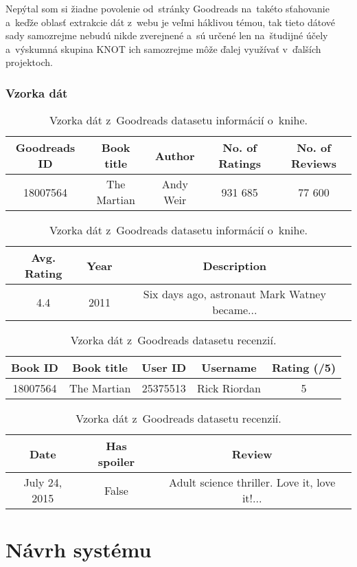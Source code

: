 Nepýtal som si žiadne povolenie od~stránky Goodreads na~takéto sťahovanie a~keďže oblasť extrakcie dát z~webu je veľmi háklivou témou, tak tieto dátové sady samozrejme nebudú nikde zverejnené a~sú určené len na~študijné účely a~výskumná skupina KNOT ich samozrejme môže ďalej využívať v~ďalších projektoch.

\subsection*{Vzorka dát}

\begin{table}[hbt]
\centering
\caption{Vzorka dát z~Goodreads datasetu informácií o~knihe.}
\label{bookinfo}
\begin{tabular}{|c|c|c|c|c|}
\hline
Goodreads ID & Book title & Author & No. of Ratings & No. of Reviews  \\
\hline
18007564 & The Martian & Andy Weir & 931 685 & 77 600\\ 
\hline
\end{tabular}
\begin{tabular}{|c|c|c|}
\hline
Avg. Rating & Year & Description \\
\hline
4.4  & 2011 & Six days ago, astronaut Mark Watney became... \\ 
\hline
\end{tabular}
\end{table}

\begin{table}[hbt]
\centering
\caption{Vzorka dát z~Goodreads datasetu recenzií.}
\label{reviewinfo}
\begin{tabular}{|c|c|c|c|c|}
\hline
Book ID & Book title & User ID  & Username & Rating (/5) \\
\hline
18007564 & The Martian & 25375513 & Rick Riordan & 5\\ 
\hline
\end{tabular}
\begin{tabular}{|c|c|c|}
\hline
Date & Has spoiler & Review \\
\hline
July 24, 2015  & False & Adult science thriller.  Love it, love it!...\\ 
\hline
\end{tabular}
\end{table}


\chapter{Návrh systému}
\label{navrh}

